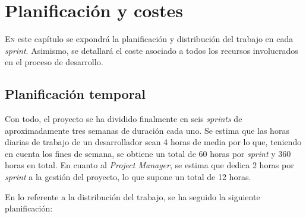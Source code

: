 \chapter{Planificación y costes}
\label{chap:planificacion}

\lettrine{E}{n} este capítulo se expondrá la planificación y distribución del trabajo en cada \textit{sprint}. Asimismo,
se detallará el coste asociado a todos los recursos involucrados en el proceso de desarrollo.

\section{Planificación temporal}
\label{sec:planificacion_temporal}

Con todo, el proyecto se ha dividido finalmente en seis \textit{sprints} de aproximadamente tres semanas de duración cada uno.
Se estima que las horas diarias de trabajo de un desarrollador sean 4 horas de media por lo que, teniendo en cuenta los fines de semana, se obtiene
un total de 60 horas por \textit{sprint} y 360 horas en total. En cuanto al \textit{Project Manager}, se estima que dedica 2 horas por \textit{sprint}
a la gestión del proyecto, lo que supone un total de 12 horas.

\bigskip
En lo referente a la distribución del trabajo, se ha seguido la siguiente planificación:

